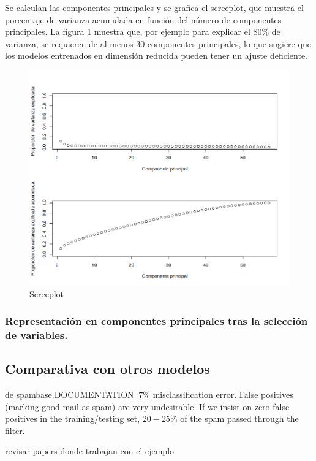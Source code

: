 \documentclass[12pt, letterpaper]{article}
\begin{document}
Se calculan las componentes principales y se grafica el screeplot, que muestra el porcentaje de varianza acumulada en función del número de componentes principales. La figura \ref{screeplot} muestra que, por ejemplo para explicar el $80\%$ de varianza, se requieren de al menos $30$ componentes principales, 
lo que sugiere que los modelos entrenados en dimensión reducida pueden tener un ajuste deficiente.

\begin{figure}[h]
\centering
	\includegraphics[scale=.5]{images/pca.png} 
	\caption{Screeplot}
		\label{screeplot}
\end{figure}


\subsubsection{Representación en componentes principales tras la selección de variables.}


\subsection{Comparativa con otros modelos}

de spambase.DOCUMENTATION
$~7\%$ misclassification error.
False positives (marking good mail as spam) are very undesirable.
If we insist on zero false positives in the training/testing set,
$20-25\%$ of the spam passed through the filter.

revisar papers donde trabajan con el ejemplo
\end{document}
